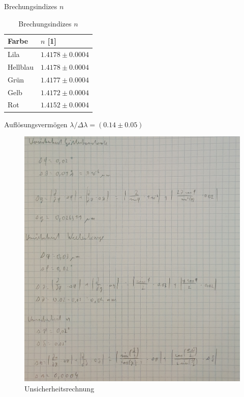 \documentclass[12pt,a4paper,twoside]{article}
\begin{document}
\noindent
Brechungsindizes $n$ \\

\begin{table}[H]
    \centering
    \caption{Brechungsindizes $n$}
    \label{tab:zus delta n}
    \begin{tabular}{| l | l |}
        \hline
        Farbe & $n$ [1] \\
        \hline
        Lila        & $ 1.4178 \pm 0.0004 $ \\
        Hellblau    & $ 1.4178 \pm 0.0004 $ \\
        Grün        & $ 1.4177 \pm 0.0004 $ \\
        Gelb        & $ 1.4172 \pm 0.0004 $ \\
        Rot         & $ 1.4152 \pm 0.0004 $ \\
        \hline
    \end{tabular}
\end{table}

\noindent
Auflösungsvermögen $\lambda / \Delta \lambda = (0.14 \pm 0.05)$

\printbibliography[heading=bibintoc]

\begin{figure}[H]
    \centering
    \includegraphics[width=1\linewidth]{nudes/uns2.jpg}
    \caption{Unsicherheitsrechnung}
    \label{fig:uns1}
\end{figure}
\end{document}

